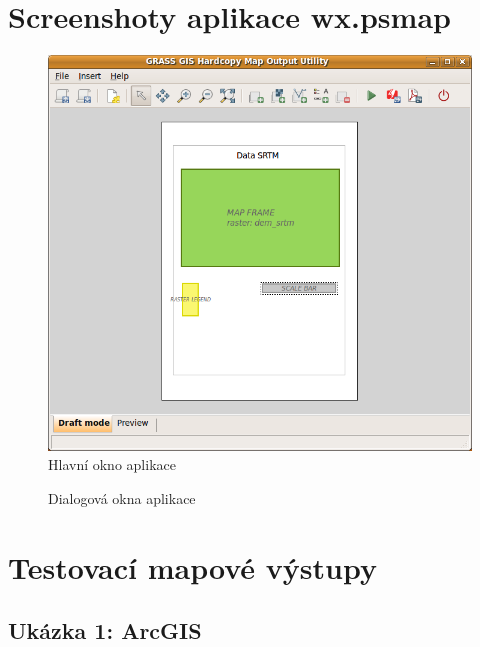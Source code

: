 \documentclass[a4paper,12pt,draft]{article}
\begin{document}
\section{Screenshoty aplikace wx.psmap}
\label{priloha:screenshot:psmap}
\begin{figure}[h!]
  \centering
  \includegraphics[height=0.4\textheight]{./GUI_screenshots/psmap_main.png}
  \caption{Hlavní okno aplikace}
  \label{fig:main}
\end{figure}
\begin{figure}[h!]
\centering
{}
\quad
{}
\caption{Dialogová okna aplikace\label{fig:dialogy}}
\end{figure}

\newpage

\section{Testovací mapové výstupy}
\label{priloha:vystupy}
\subsection{Ukázka 1: ArcGIS}
\label{priloha:vystupy:arcgis1}
\end{document}
